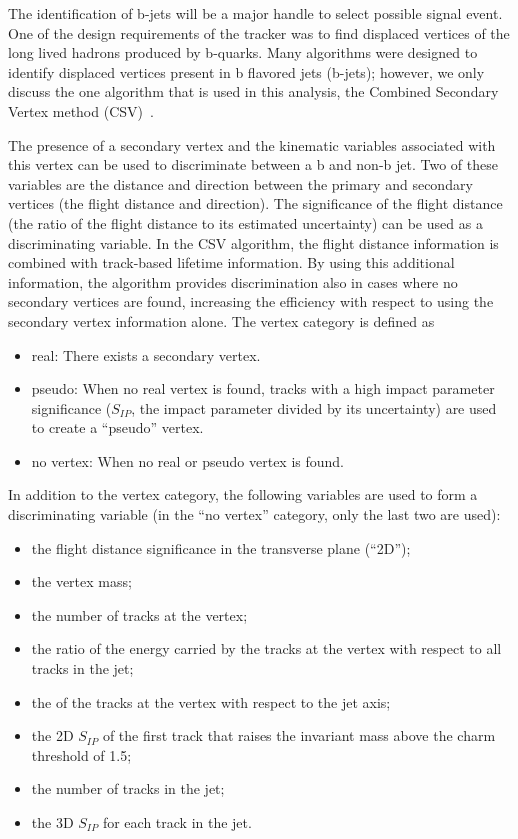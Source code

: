 The identification of b-jets will be a major handle to select possible signal
event. One of the design requirements of the tracker was to find displaced
vertices of the long lived hadrons produced by b-quarks. Many algorithms were
designed to identify displaced vertices present in b flavored jets (b-jets);
however, we only discuss the one algorithm that is used in this analysis, the
Combined Secondary Vertex method (CSV)~\cite{btagging}.

The presence of a secondary vertex and the kinematic variables associated with
this vertex can be used to discriminate between a b and non-b jet. Two of these
variables are the distance and direction between the primary and secondary
vertices (the flight distance and direction). The significance of the flight
distance (the ratio of the flight distance to its estimated uncertainty) can be
used as a discriminating variable. In the CSV algorithm, the flight distance
information is combined with track-based lifetime information. By using this
additional information, the algorithm provides discrimination also in cases
where no secondary vertices are found, increasing the efficiency with respect
to using the secondary vertex information alone. The vertex category is defined
as
\begin{itemize}
  \item real: There exists a secondary vertex.
  \item pseudo: When no real vertex is found, tracks with a high impact parameter
significance ($S_{IP}$, the impact parameter divided by its uncertainty) are used
to create a ``pseudo'' vertex.
  \item no vertex: When no real or pseudo vertex is found.
\end{itemize}
In addition to the vertex category, the following variables are used to form a
discriminating variable (in the ``no vertex'' category, only the last two are
used):
\begin{itemize}
  \item the flight distance significance in the transverse plane (``2D'');
  \item the vertex mass;
  \item the number of tracks at the vertex;
  \item the ratio of the energy carried by the tracks at the vertex with respect to all tracks in the jet;
  \item the \pr of the tracks at the vertex with respect to the jet axis;
  \item the 2D $S_{IP}$ of the first track that raises the invariant mass above the charm threshold of 1.5\GeVcc;
  \item the number of tracks in the jet;
  \item the 3D $S_{IP}$ for each track in the jet.
\end{itemize}
